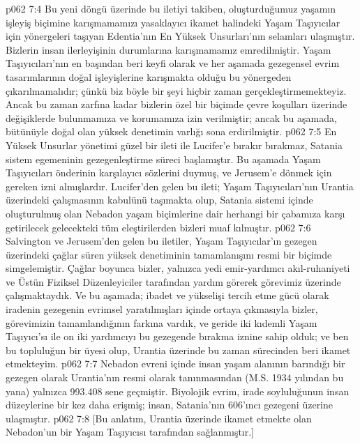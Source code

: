 \vs p062 7:4 Bu yeni döngü üzerinde bu iletiyi takiben, oluşturduğumuz yaşamın işleyiş biçimine karışmamamızı yasaklayıcı ikamet halindeki Yaşam Taşıyıcılar için yönergeleri taşıyan Edentia’nın En Yüksek Unsurları’nın selamları ulaşmıştır. Bizlerin insan ilerleyişinin durumlarına karışmamamız emredilmiştir. Yaşam Taşıyıcıları’nın en başından beri keyfi olarak ve her aşamada gezegensel evrim tasarımlarının doğal işleyişlerine karışmakta olduğu bu yönergeden çıkarılmamalıdır; çünkü biz böyle bir şeyi hiçbir zaman gerçekleştirmemekteyiz. Ancak bu zaman zarfına kadar bizlerin özel bir biçimde çevre koşulları üzerinde değişiklerde bulunmamıza ve korumamıza izin verilmiştir; ancak bu aşamada, bütünüyle doğal olan yüksek denetimin varlığı sona erdirilmiştir.
\vs p062 7:5 En Yüksek Unsurlar yönetimi güzel bir ileti ile Lucifer’e bırakır bırakmaz, Satania sistem egemeninin gezegenleştirme süreci başlamıştır. Bu aşamada Yaşam Taşıyıcıları önderinin karşılayıcı sözlerini duymuş, ve Jerusem’e dönmek için gereken izni almışlardır. Lucifer’den gelen bu ileti; Yaşam Taşıyıcıları’nın Urantia üzerindeki çalışmasının kabulünü taşımakta olup, Satania sistemi içinde oluşturulmuş olan Nebadon yaşam biçimlerine dair herhangi bir çabamıza karşı getirilecek gelecekteki tüm eleştirilerden bizleri muaf kılmıştır.
\vs p062 7:6 Salvington ve Jerusem’den gelen bu iletiler, Yaşam Taşıyıcılar’ın gezegen üzerindeki çağlar süren yüksek denetiminin tamamlanışını resmi bir biçimde simgelemiştir. Çağlar boyunca bizler, yalnızca yedi emir\hyp{}yardımcı akıl\hyp{}ruhaniyeti ve Üstün Fiziksel Düzenleyiciler tarafından yardım görerek görevimiz üzerinde çalışmaktaydık. Ve bu aşamada; ibadet ve yükselişi tercih etme gücü olarak iradenin gezegenin evrimsel yaratılmışları içinde ortaya çıkmasıyla bizler, görevimizin tamamlandığının farkına vardık, ve geride iki kıdemli Yaşam Taşıyıcı’sı ile on iki yardımcıyı bu gezegende bırakma iznine sahip olduk; ve ben bu topluluğun bir üyesi olup, Urantia üzerinde bu zaman sürecinden beri ikamet etmekteyim.
\vs p062 7:7 Nebadon evreni içinde insan yaşam alanının barındığı bir gezegen olarak Urantia’nın resmi olarak tanınmasından (M.S. 1934 yılından bu yana) yalnızca 993.408 sene geçmiştir. Biyolojik evrim, irade soyluluğunun insan düzeylerine bir kez daha erişmiş; insan, Satania’nın 606’ıncı gezegeni üzerine ulaşmıştır.
\vs p062 7:8 [Bu anlatım, Urantia üzerinde ikamet etmekte olan Nebadon’un bir Yaşam Taşıyıcısı tarafından sağlanmıştır.]
